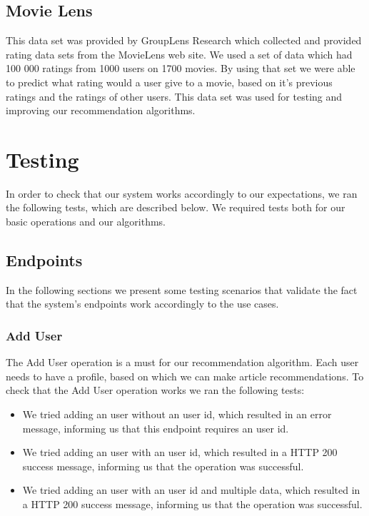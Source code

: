 \subsection{Movie Lens} 
\label{sec:testing-and-validation-data-sources-movie-lens}
This data set was provided by GroupLens Research which collected and provided rating data sets from the MovieLens web site. We used a set of data which had  100 000 ratings from 1000 users on 1700 movies.
By using that set we were able to predict what rating would a user give to a movie, based on it's previous ratings and the ratings of other users. This data set was used for testing and improving our recommendation algorithms.

\section{Testing} 
\label{sec:testing-and-validation-testing}
In order to check that our system works accordingly to our expectations, we ran the following tests, which are described below.
We required tests both for our basic operations and our algorithms.

\subsection{Endpoints} 
\label{sec:basic-operations}
In the following sections we present some testing scenarios that validate the fact that the system's endpoints work accordingly to the use cases.

\subsubsection{Add User}
\label{sec:basic-operations-add-user}
The Add User operation is a must for our recommendation algorithm. Each user needs to have  a profile, based on which we can make article recommendations. To check that the Add User operation works we ran the following tests: 
\begin{itemize}
	\item We tried adding an user without an user id, which resulted in an error message, informing us that this endpoint requires an user id.
	\item We tried adding an user with an user id, which resulted in a HTTP 200 success message, informing us that the operation was successful.
	\item We tried adding an user with an user id and multiple data, which resulted in a HTTP 200 success message, informing us that the operation was successful.
\end{itemize}

